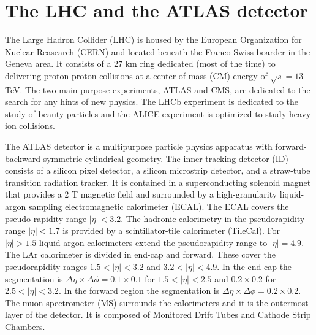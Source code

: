 
\section{The LHC and the ATLAS detector}
\label{sec:det}
 
The Large Hadron Collider (LHC) is housed by the European Organization for Nuclear Reasearch (CERN) and located beneath the Franco-Swiss boarder in the Geneva area. It consists of a $27$ km ring dedicated (most of the time) to delivering proton-proton collisions at a center of mass (CM) energy of $\sqrt{s}=13$ TeV. The two main purpose experiments, ATLAS and CMS, are dedicated to the search for any hints of new physics. The LHCb experiment is dedicated to the study of beauty particles and the ALICE experiment is optimized to study heavy ion collisions. 

The ATLAS detector is a multipurpose particle physics apparatus with forward-backward symmetric  cylindrical geometry. The inner tracking detector (ID) consists of  a  silicon  pixel detector,  a  silicon  microstrip detector, and a straw-tube transition radiation tracker. It is contained in a superconducting solenoid magnet that provides a $2$ T magnetic field and surrounded by a high-granularity liquid-argon sampling electromagnetic calorimeter (ECAL). The ECAL covers the pseudo-rapidity range $|\eta|<3.2$. The hadronic calorimetry in the pseudorapidity range $|\eta| < 1.7$ is provided by a scintillator-tile calorimeter (TileCal). For $|\eta|>1.5$ liquid-argon calorimeters extend the pseudorapidity range to $|\eta|=4.9$. The LAr calorimeter is divided in end-cap and forward. These cover the pseudorapidity ranges $1.5 < |\eta| < 3.2$ and $3.2 < |\eta| <
4.9$. In the end-cap the segmentation is $\Delta\eta\times\Delta\phi = 0.1 \times 0.1$ for $1.5 < |\eta| < 2.5$ and $0.2 \times 0.2$ for $2.5 < |\eta| < 3.2$. In the forward region the segmentation is $\Delta\eta\times\Delta\phi = 0.2 \times 0.2$. The muon spectrometer (MS) surrounds the calorimeters and it is the outermost layer of the detector. It is composed of Monitored Drift Tubes and Cathode Strip Chambers.